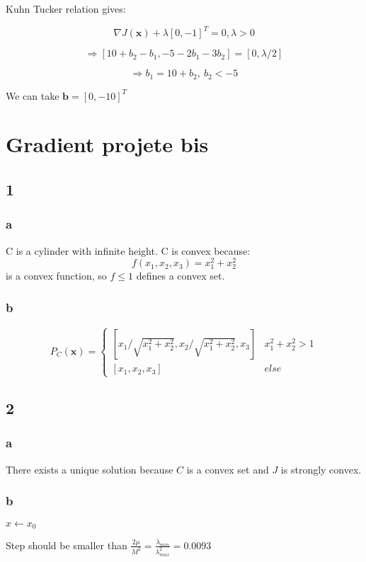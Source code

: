 \documentclass{article}
\begin{document}
Kuhn Tucker relation gives:

$$
\nabla J(\mathbf{x}) + \lambda [0,-1]^T = 0, \lambda > 0
$$

$$
\Rightarrow [10+b_2-b_1, -5-2b_1-3b_2] = [0, \lambda/2]
$$

$$
\Rightarrow b_1 = 10+b_2,\ b_2 < -5
$$

We can take $\mathbf{b} = [0,-10]^T$

\section*{Gradient projete bis}
\subsection*{1}
\subsubsection*{a}
C is a cylinder with infinite height. C is convex because:
$$
f(x_1,x_2,x_3)=x_1^2+x_2^2
$$
is a convex function, so $f\leq 1$ defines a convex set.

\subsubsection*{b}
\[
P_C(\mathbf{x}) =
\begin{cases}
[x_1/\sqrt{x_1^2+x_2^2},x_2/\sqrt{x_1^2+x_2^2},x_3] & x_1^2+x_2^2 > 1\\
[x_1,x_2,x_3] & else
\end{cases}
\]

\subsection*{2}
\subsubsection*{a}
There exists a unique solution because $C$ is a convex set and $J$ is strongly convex.
\subsubsection*{b}\begin{algorithm}[H]
	$x \leftarrow x_0$\\
\end{algorithm}
Step should be smaller than  $\frac{2\mu}{M^2} = \frac{\lambda_{min}}{\lambda_{max}^2} = 0.0093$
\end{document}

